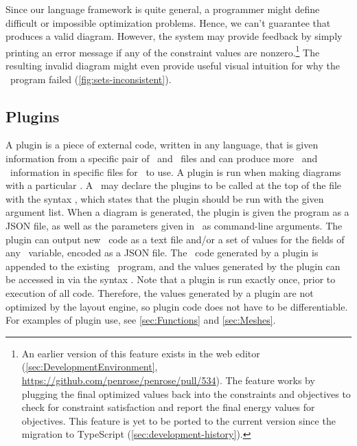 Since our language framework is quite general, a programmer might define difficult or impossible optimization problems.  Hence, we can't guarantee that \Penrose{} produces a valid diagram.  However, the system may provide feedback by simply printing an error message if any of the constraint values are nonzero.\footnote{An earlier version of this feature exists in the \Penrose{} web editor (\cref{sec:DevelopmentEnvironment}, \url{https://github.com/penrose/penrose/pull/534}). The feature works by plugging the final optimized values back into the constraints and objectives to check for constraint satisfaction and report the final energy values for objectives. This feature is yet to be ported to the current version since the migration to TypeScript (\cref{sec:development-history}).}  The resulting invalid diagram might even provide useful visual intuition for why the \Style\ program failed (\cref{fig:sets-inconsistent}).

\subsection{Plugins}
\label{sec:PlugIns}

A plugin is a piece of external code, written in any language, that is given information from a specific pair of \Substance\ and \Style\ files and can produce more \Substance\ and \Style\ information in specific files for \Penrose\ to use. A plugin is run when making diagrams with a particular \Style. A \Style\ may declare the plugins to be called at the top of the file with the syntax \mbox{,} which states that the plugin  should be run with the given argument list. When a diagram is generated, the plugin is given the \Substance{} program as a JSON file, as well as the parameters given in \Style\ as command-line arguments. The plugin can output new \Substance\ code as a text file and/or a set of values for the fields of any \Substance\ variable, encoded as a JSON file. The \Substance\ code generated by a plugin is appended to the existing \Substance\ program, and the values generated by the plugin can be accessed in \Style{} via the syntax . Note that a plugin is run exactly once, prior to execution of all \Penrose{} code. Therefore, the values generated by a plugin are not optimized by the layout engine, so plugin code does not have to be differentiable. For examples of plugin use, see \cref{sec:Functions} and \cref{sec:Meshes}.

